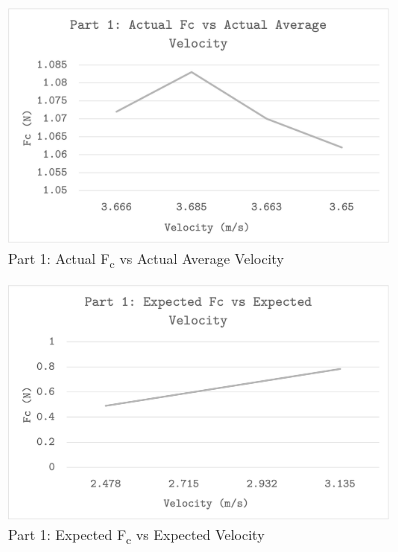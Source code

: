 \begin{figure}[H]
	\captionsetup{font=Large}
	\caption{Part 1: Actual F\textsubscript{c} vs Actual Average Velocity}
	\begin{center}
		\includegraphics[width=0.90\textwidth]{images/p1Actual}
	\end{center}
	\label{fig:p1Actual}
\end{figure}

\begin{figure}[H]
	\captionsetup{font=Large}
	\caption{Part 1: Expected F\textsubscript{c} vs Expected Velocity}
	\begin{center}
		\includegraphics[width=0.90\textwidth]{images/p1Expected}
	\end{center}
	\label{fig:p1Expected}
\end{figure}


